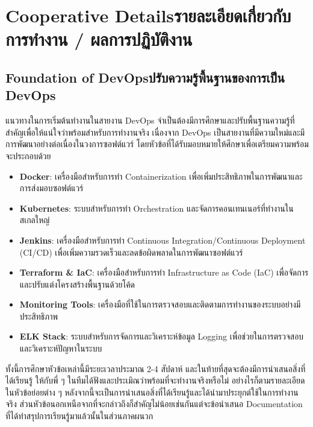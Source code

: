 

\setcounter{secnumdepth}{3}

\chapter{\ifenglish Cooperative Details\else รายละเอียดเกี่ยวกับการทำงาน / ผลการปฏิบัติงาน \fi}


\section{\ifenglish Foundation of DevOps\else ปรับความรู้พื้นฐานของการเป็น DevOps\fi}
แนวทางในการเริ่มต้นทำงานในสายงาน DevOps จำเป็นต้องมีการศึกษาและปรับพื้นฐานความรู้ที่สำคัญเพื่อให้แน่ใจว่าพร้อมสำหรับการทำงานจริง
เนื่องจาก DevOps เป็นสายงานที่มีความใหม่และมีการพัฒนาอย่างต่อเนื่องในวงการซอฟต์แวร์ โดยหัวข้อที่ได้รับมอบหมายให้ศึกษาเพื่อเตรียมความพร้อมจะประกอบด้วย

\begin{itemize}
      \item \textbf{Docker}: เครื่องมือสำหรับการทำ Containerization เพื่อเพิ่มประสิทธิภาพในการพัฒนาและการส่งมอบซอฟต์แวร์
      \item \textbf{Kubernetes}: ระบบสำหรับการทำ Orchestration และจัดการคอนเทนเนอร์ที่ทำงานในสเกลใหญ่
      \item \textbf{Jenkins}: เครื่องมือสำหรับการทำ Continuous Integration/Continuous Deployment (CI/CD) เพื่อเพิ่มความรวดเร็วและลดข้อผิดพลาดในการพัฒนาซอฟต์แวร์
      \item \textbf{Terraform \& IaC}: เครื่องมือสำหรับการทำ Infrastructure as Code (IaC) เพื่อจัดการและปรับแต่งโครงสร้างพื้นฐานด้วยโค้ด
      \item \textbf{Monitoring Tools}: เครื่องมือที่ใช้ในการตรวจสอบและติดตามการทำงานของระบบอย่างมีประสิทธิภาพ
      \item \textbf{ELK Stack}: ระบบสำหรับการจัดการและวิเคราะห์ข้อมูล Logging เพื่อช่วยในการตรวจสอบและวิเคราะห์ปัญหาในระบบ
\end{itemize}

ทั้งนี้การศึกษาหัวข้อเหล่านี้มีระยะเวลาประมาณ 2-4 สัปดาห์ และในท้ายที่สุดจะต้องมีการนำเสนอสิ่งที่ได้เรียนรู้
ให้กับพี่ ๆ ในทีมได้ฟังและประเมิณว่าพร้อมที่จะทำงานจริงหรือไม่ อย่างไรก็ตามรายละเอียดในหัวข้อย่อยต่าง ๆ หลังจากนี้จะเป็นการนำเสนอสิ่งที่ได้เรียนรู้และได้นำมาประยุกต์ใช้ในการทำงานจริง
ส่วนหัวข้อนอกเหนือจากที่จะกล่าวถึงก็สำคัญไม่น้อยเช่นกันแต่จะข้อนำเสนอ Documentation ที่ได้ทำสรุปการเรียนรู้มาแล้วนั้นในส่วนภาคผนวก


